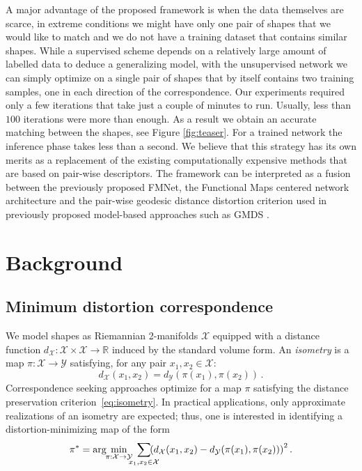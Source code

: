 \documentclass[10pt,twocolumn,letterpaper]{article}
\begin{document}
A major advantage of the proposed framework is when the data themselves are scarce, in extreme conditions we might have only one pair of shapes that we would like to match and we do not have a training dataset that contains similar shapes. 
While a supervised scheme depends on a relatively large amount of labelled data to deduce a generalizing model, with the unsupervised network we can simply optimize on a single pair of shapes that by itself contains two training samples, one in each direction of the correspondence.
Our experiments required only a few iterations that take just a couple of  minutes to run. 
Usually, less than $100$ iterations were more than enough. 
As a result we obtain an accurate matching between the shapes, see Figure \ref{fig:teaser}. 
For a trained network the inference phase takes less than a second. 
We believe that this strategy has its own merits as a replacement of the existing computationally expensive methods that are based on pair-wise descriptors. 
The framework can be interpreted as a fusion between the previously proposed FMNet, the Functional Maps centered network architecture \cite{litany2017deep} and the pair-wise geodesic distance distortion criterion used in previously proposed model-based approaches such as GMDS \cite{bronstein2006generalized}. 


\section{Background}

\subsection{Minimum distortion correspondence}
We model shapes as Riemannian 2-manifolds $\mathcal{X}$ equipped with a distance function $d_\mathcal{X}:\mathcal{X}\times\mathcal{X}\to\mathbb{R}$ induced by the standard volume form. An {\em isometry} is a map $\pi:\mathcal{X}\to\mathcal{Y}$ satisfying, for any pair $x_1,x_2\in\mathcal{X}$:
\begin{equation}\label{eq:isometry}
    d_\mathcal{X}(x_1,x_2) = d_\mathcal{Y}({\pi}(x_1),{\pi}(x_2))\,.
\end{equation}
Correspondence seeking approaches optimize for a map ${\pi}$ satisfying the distance preservation criterion~\eqref{eq:isometry}. In practical applications, only approximate realizations of an isometry are expected; thus, one is interested in identifying a distortion-minimizing map of the form
\begin{equation}\label{eq:distortion}
    \pi^\ast = \arg\hspace{-0.1cm}\min_{\pi:\mathcal{X}\to\mathcal{Y}}
    \hspace{-0.2cm}
    \sum_{\substack{x_1,x_2 \in \mathcal{X}}}
    \hspace{-0.4cm}
    \left( d_\mathcal{X}(x_1,x_2) - d_\mathcal{Y}({\pi}(x_1),{\pi}(x_2)) \right)^2.
\end{equation}
\end{document}
